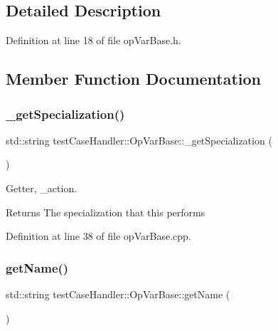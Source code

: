 \subsection{Detailed Description}


Definition at line 18 of file op\+Var\+Base.\+h.



\subsection{Member Function Documentation}
\mbox{\label{classtestCaseHandler_1_1OpVarBase_a2bb0e2b84284e726c7dbdf2a9fbe17e9}} 
\subsubsection{\texorpdfstring{\_getSpecialization()}{\_getSpecialization()}}
{\footnotesize\ttfamily std\+::string test\+Case\+Handler\+::\+Op\+Var\+Base\+::\+\_\+get\+Specialization (\begin{DoxyParamCaption}{ }\end{DoxyParamCaption})\hspace{0.3cm}{\ttfamily [protected]}}



Getter, \+\_\+action. 

\begin{DoxyReturn}{Returns}
The specialization that this performs 
\end{DoxyReturn}


Definition at line 38 of file op\+Var\+Base.\+cpp.

\mbox{\label{classtestCaseHandler_1_1OpVarBase_aa493e51a8cd2c6ca0734acd8154b65ef}} 
\subsubsection{\texorpdfstring{getName()}{getName()}}
{\footnotesize\ttfamily std\+::string test\+Case\+Handler\+::\+Op\+Var\+Base\+::get\+Name (\begin{DoxyParamCaption}{ }\end{DoxyParamCaption})}



